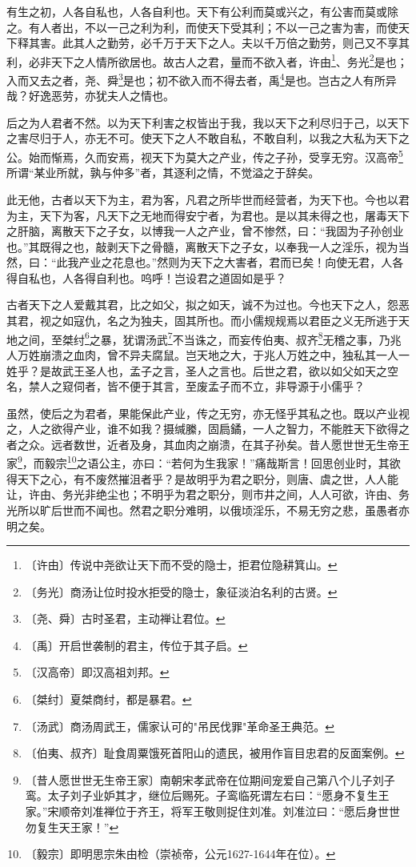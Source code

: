 \documentclass[12pt,UTF-8,openany,a4]{ctexbook}
\begin{document}
\begin{large}
    
    有生之初，人各自私也，人各自利也。天下有公利而莫或兴之，有公害而莫或除之。有人者出，不以一己之利为利，而使天下受其利；不以一己之害为害，而使天下释其害。此其人之勤劳，必千万于天下之人。夫以千万倍之勤劳，则己又不享其利，必非天下之人情所欲居也。故古人之君，量而不欲入者，许由\footnote{〔许由〕\yiwen 传说中尧欲让天下而不受的隐士，拒君位隐耕箕山。}、务光\footnote{〔务光〕\yiwen 商汤让位时投水拒受的隐士，象征淡泊名利的古贤。}是也；入而又去之者，尧、舜\footnote{〔尧、舜〕\yiwen 古时圣君，主动禅让君位。}是也；初不欲入而不得去者，禹\footnote{〔禹〕\yiwen 开启世袭制的君主，传位于其子启。}是也。岂古之人有所异哉？好逸恶劳，亦犹夫人之情也。
    
    后之为人君者不然。以为天下利害之权皆出于我，我以天下之利尽归于己，以天下之害尽归于人，亦无不可。使天下之人不敢自私，不敢自利，以我之大私为天下之公。始而惭焉，久而安焉，视天下为莫大之产业，传之子孙，受享无穷。汉高帝\footnote{〔汉高帝〕\yiwen 即汉高祖刘邦。}所谓“某业所就，孰与仲多”者，其逐利之情，不觉溢之于辞矣。
    
    此无他，古者以天下为主，君为客，凡君之所毕世而经营者，为天下也。今也以君为主，天下为客，凡天下之无地而得安宁者，为君也。是以其未得之也，屠毒天下之肝脑，离散天下之子女，以博我一人之产业，曾不惨然，曰：“我固为子孙创业也。”其既得之也，敲剥天下之骨髓，离散天下之子女，以奉我一人之淫乐，视为当然，曰：“此我产业之花息也。”然则为天下之大害者，君而已矣！向使无君，人各得自私也，人各得自利也。呜呼！岂设君之道固如是乎？
    
    古者天下之人爱戴其君，比之如父，拟之如天，诚不为过也。今也天下之人，怨恶其君，视之如寇仇，名之为独夫，固其所也。而小儒规规焉以君臣之义无所逃于天地之间，至桀纣\footnote{〔桀纣〕\yiwen 夏桀商纣，都是暴君。}之暴，犹谓汤武\footnote{〔汤武〕\yiwen 商汤周武王，儒家认可的"吊民伐罪"革命圣王典范。}不当诛之，而妄传伯夷、叔齐\footnote{〔伯夷、叔齐〕\yiwen 耻食周粟饿死首阳山的遗民，被用作盲目忠君的反面案例。}无稽之事，乃兆人万姓崩溃之血肉，曾不异夫腐鼠。岂天地之大，于兆人万姓之中，独私其一人一姓乎？是故武王圣人也，孟子之言，圣人之言也。后世之君，欲以如父如天之空名，禁人之窥伺者，皆不便于其言，至废孟子而不立，非导源于小儒乎？
    
    虽然，使后之为君者，果能保此产业，传之无穷，亦无怪乎其私之也。既以产业视之，人之欲得产业，谁不如我？摄缄縢，固扃鐍，一人之智力，不能胜天下欲得之者之众。远者数世，近者及身，其血肉之崩溃，在其子孙矣。昔人愿世世无生帝王家\footnote{〔昔人愿世世无生帝王家〕\yiwen 南朝宋孝武帝在位期间宠爱自己第八个儿子刘子鸾。太子刘子业妒其才，继位后赐死。子鸾临死谓左右曰：“愿身不复生王家。”宋顺帝刘准禅位于齐王，将军王敬则捉住刘准。刘准泣曰：“愿后身世世勿复生天王家！”}，而毅宗\footnote{〔毅宗〕\yiwen 即明思宗朱由检（崇祯帝，公元1627-1644年在位）。}之语公主，亦曰：“若何为生我家！”痛哉斯言！回思创业时，其欲得天下之心，有不废然摧沮者乎？是故明乎为君之职分，则唐、虞之世，人人能让，许由、务光非绝尘也；不明乎为君之职分，则市井之间，人人可欲，许由、务光所以旷后世而不闻也。然君之职分难明，以俄顷淫乐，不易无穷之悲，虽愚者亦明之矣。

\end{large}
\end{document}

